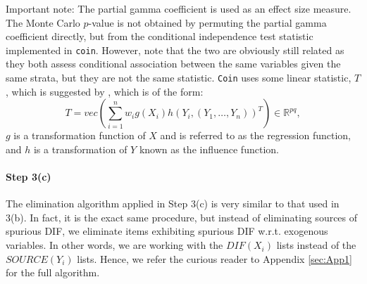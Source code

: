 \documentclass[a4project,12pt]{article}
\theoremstyle{examplestyle}
\theoremstyle{defstyle}
\theoremstyle{thmstyle}
\begin{document}
Important note: The partial gamma coefficient is used as an effect size measure. The
Monte Carlo $p$-value is not obtained by permuting the partial gamma coefficient directly, but from the conditional independence test statistic implemented in \texttt{coin}. However, note that the two are obviously still related as they both assess conditional association between the same variables given the same strata, but they are not the same statistic. \texttt{Coin} uses some linear statistic, $T$, which is suggested by \cite{strasser-weber-1999}, which is of the form:
\begin{equation}
    T= vec\left( 
    \sum_{i=1}^nw_ig(X_i)h(Y_i,(Y_1,\dots,Y_n))^T
    \right) \in \mathbb{R}^{pq},
\end{equation}
$g$ is a transformation function of $X$ and is referred to as the regression function, and $h$ is a transformation of $Y$ known as the influence function.


\newpage


\paragraph{Step 3(c)} The elimination algorithm applied in Step 3(c) is very similar to that used in 3(b). In fact, it is the exact same procedure, but instead of eliminating sources of spurious DIF, we eliminate items exhibiting spurious DIF w.r.t. exogenous variables. In other words, we are working with the $DIF(X_i)$ lists instead of the $SOURCE(Y_i)$ lists. Hence, we refer the curious reader to Appendix \ref{sec:App1} for the full algorithm. 
\end{document}
